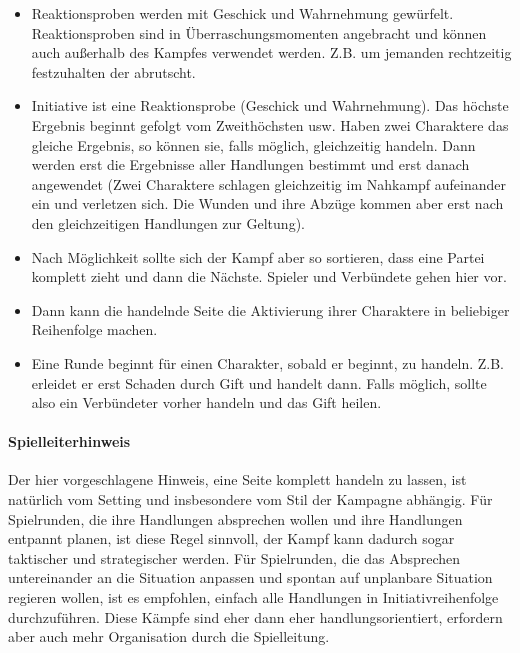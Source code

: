 \documentclass{article}
\begin{document}
\begin{itemize}
\item Reaktionsproben werden mit Geschick und Wahrnehmung gewürfelt. Reaktionsproben sind in Überraschungsmomenten angebracht und können auch außerhalb des Kampfes verwendet werden. Z.B. um jemanden rechtzeitig festzuhalten der abrutscht.
\item Initiative ist eine Reaktionsprobe (Geschick und Wahrnehmung). Das höchste Ergebnis beginnt gefolgt vom Zweithöchsten usw. Haben zwei Charaktere das gleiche Ergebnis, so können sie, falls möglich, gleichzeitig handeln. Dann werden erst die Ergebnisse aller Handlungen bestimmt und erst danach angewendet (Zwei Charaktere schlagen gleichzeitig im Nahkampf aufeinander ein und verletzen sich. Die Wunden und ihre Abzüge kommen aber erst nach den gleichzeitigen Handlungen zur Geltung).
\item Nach Möglichkeit sollte sich der Kampf aber so sortieren, dass eine Partei komplett zieht und dann die Nächste. Spieler und Verbündete gehen hier vor.
\item Dann kann die handelnde Seite die Aktivierung ihrer Charaktere in beliebiger Reihenfolge machen.
\item Eine Runde beginnt für einen Charakter, sobald er beginnt, zu handeln. Z.B. erleidet er erst Schaden durch Gift und handelt dann. Falls möglich, sollte also ein Verbündeter vorher handeln und das Gift heilen.
\end{itemize}

\begin{mdframed}[hidealllines=true, backgroundcolor=black!10]
\paragraph{Spielleiterhinweis}

Der hier vorgeschlagene Hinweis, eine Seite komplett handeln zu lassen, ist natürlich vom Setting und insbesondere
vom Stil der Kampagne abhängig. Für Spielrunden, die ihre Handlungen absprechen wollen und ihre Handlungen
entpannt planen, ist diese Regel sinnvoll, der Kampf kann dadurch sogar taktischer und strategischer werden. Für
Spielrunden, die das Absprechen untereinander an die Situation anpassen und spontan auf unplanbare Situation regieren
wollen, ist es empfohlen, einfach alle Handlungen in Initiativreihenfolge durchzuführen. Diese Kämpfe sind eher dann eher
handlungsorientiert, erfordern aber auch mehr Organisation durch die Spielleitung.

\end{mdframed}
\end{document}
